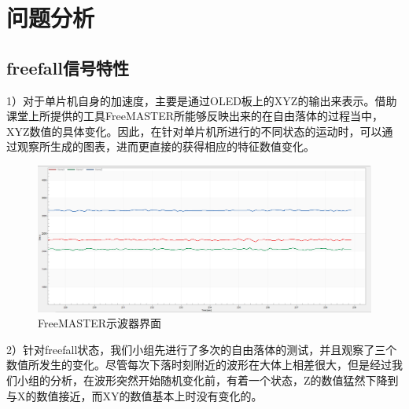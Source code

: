 \section{问题分析}
\subsection{freefall信号特性}
\par{1）对于单片机自身的加速度，主要是通过OLED板上的XYZ的输出来表示。借助课堂上所提供的工具FreeMASTER所能够反映出来的在自由落体的过程当中，XYZ数值的具体变化。因此，在针对单片机所进行的不同状态的运动时，可以通过观察所生成的图表，进而更直接的获得相应的特征数值变化。}

\begin{figure}[H]
\centering
\includegraphics[width=12cm]{figure/6.1.1.png}
\caption{FreeMASTER示波器界面} \label{fig:6.1.1}
\end{figure}

\par{2）针对freefall状态，我们小组先进行了多次的自由落体的测试，并且观察了三个数值所发生的变化。尽管每次下落时刻附近的波形在大体上相差很大，但是经过我们小组的分析，在波形突然开始随机变化前，有着一个状态，Z的数值猛然下降到与X的数值接近，而XY的数值基本上时没有变化的。}


